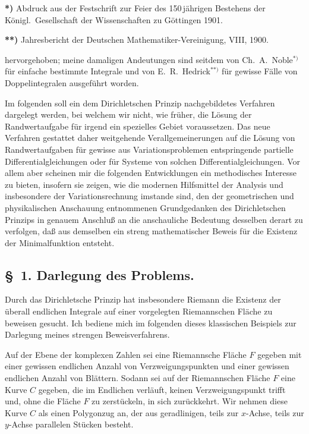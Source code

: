 \documentclass{article}
\begin{document}
\textbf{*)} Abdruck aus der Festschrift zur Feier des 150\,jährigen Bestehens der Königl.\ Gesellschaft der Wissenschaften zu Göttingen 1901.

\textbf{**)} Jahresbericht der Deutschen Mathematiker-Vereinigung, VIII, 1900.

hervorgehoben; meine damaligen Andeutungen sind seitdem von Ch.~A.~Noble${}^{*)}$ für einfache bestimmte Integrale und von E.~R.~Hedrick${}^{**)}$ für gewisse Fälle von Doppelintegralen ausgeführt worden.

Im folgenden soll ein dem Dirichletschen Prinzip nachgebildetes Verfahren dargelegt werden, bei welchem wir nicht, wie früher, die Lösung der Randwertaufgabe für irgend ein spezielles Gebiet voraussetzen. Das neue Verfahren gestattet daher weitgehende Verallgemeinerungen auf die Lösung von Randwertaufgaben für gewisse aus Variationsproblemen entspringende partielle Differentialgleichungen oder für Systeme von solchen Differentialgleichungen. Vor allem aber scheinen mir die folgenden Entwicklungen ein methodisches Interesse zu bieten, insofern sie zeigen, wie die modernen Hilfsmittel der Analysis und insbesondere der Variationsrechnung imstande sind, den der geometrischen und physikalischen Anschauung entnommenen Grundgedanken des Dirichletschen Prinzips in genauem Anschluß an die anschauliche Bedeutung desselben derart zu verfolgen, daß aus demselben ein streng mathematischer Beweis für die Existenz der Minimalfunktion entsteht.

\subsection*{§~1. Darlegung des Problems.}

Durch das Dirichletsche Prinzip hat insbesondere Riemann die Existenz der überall endlichen Integrale auf einer vorgelegten Riemannschen Fläche zu beweisen gesucht. Ich bediene mich im folgenden dieses klassischen Beispiels zur Darlegung meines strengen Beweisverfahrens.

Auf der Ebene der komplexen Zahlen sei eine Riemannsche Fläche $F$ gegeben mit einer gewissen endlichen Anzahl von Verzweigungspunkten und einer gewissen endlichen Anzahl von Blättern. Sodann sei auf der Riemannschen Fläche $F$ eine Kurve $C$ gegeben, die im Endlichen verläuft, keinen Verzweigungspunkt trifft und, ohne die Fläche $F$ zu zerstückeln, in sich zurückkehrt. Wir nehmen diese Kurve $C$ als einen Polygonzug an, der aus geradlinigen, teils zur $x$-Achse, teils zur $y$-Achse parallelen Stücken besteht.
\end{document}
